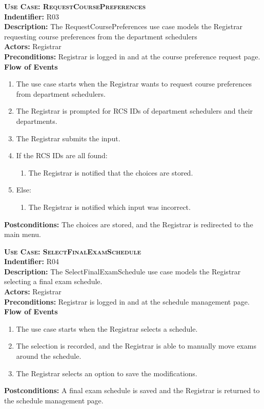 \documentclass[11pt]{article}
\newcounter{id}
\newenvironment{usecase}{%
	\def\title##1{ {\large \bfseries  \scshape {Use Case:} ##1} \\ }
 	\def\id##1{{\bf Indentifier:} ##1\\}
	\def\des##1{ {\bf Description:} ##1\\}
	\def\actors##1{ {\bf Actors:} ##1\\}
    	\def\pre##1{ {\bf Preconditions:} ##1 \\} %
    	\def\flow##1{ {\bf Flow of Events} ##1}%
    	\newenvironment{ucenum}{%
        	\begin{enumerate}[nolistsep]\small}%
        	{\end{enumerate}}
	\def\post##1{ {\bf Postconditions:} ##1 \\}
}{\vspace{.05in}}
\begin{document}
\begin{usecase}
  \title{RequestCoursePreferences}
  \id{R03}
  \des{The RequestCoursePreferences use case models the Registrar requesting course preferences from the department schedulers}
  \actors{Registrar}
  \pre{Registrar is logged in and at the course preference request page.}
  \flow{}
  \begin{ucenum}
  \item The use case starts when the Registrar wants to request course preferences from department schedulers.
  \item The Registrar is prompted for RCS IDs of department schedulers and their departments.
  \item The Registrar submits the input.
  \item If the RCS IDs are all found:
    \begin{ucenum} \item The Registrar is notified that the choices are stored. \end{ucenum}
  \item Else:
    \begin{ucenum} \item The Registrar is notified which input was incorrect. \end{ucenum}
  \end{ucenum}
  \post{The choices are stored, and the Registrar is redirected to the main menu.}
\end{usecase}

\begin{usecase}
  \title{SelectFinalExamSchedule}
  \id{R04}
  \des{The SelectFinalExamSchedule use case models the Registrar selecting a final exam schedule.}
  \actors{Registrar}
  \pre{Registrar is logged in and at the schedule management page.}
  \flow{}
  \begin{ucenum}
  \item The use case starts when the Registrar selects a schedule.
  \item The selection is recorded, and the Registrar is able to manually move exams around the schedule.
  \item The Registrar selects an option to save the modifications.
  \end{ucenum}
  \post{A final exam schedule is saved and the Registrar is returned to the schedule management page.}
\end{usecase}
\end{document}
